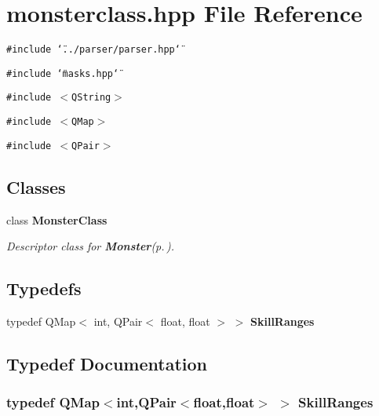 \section{monsterclass.hpp File Reference}
\label{monsterclass_8hpp}
{\tt \#include \char`\"{}../parser/parser.hpp\char`\"{}}\par
{\tt \#include \char`\"{}masks.hpp\char`\"{}}\par
{\tt \#include $<$QString$>$}\par
{\tt \#include $<$QMap$>$}\par
{\tt \#include $<$QPair$>$}\par
\subsection*{Classes}
\begin{CompactItemize}
\item 
class {\bf Monster\-Class}
\begin{CompactList}\small\item\em Descriptor class for {\bf Monster}{\rm (p.\,\pageref{classMonster})}. \item\end{CompactList}\end{CompactItemize}
\subsection*{Typedefs}
\begin{CompactItemize}
\item 
typedef QMap$<$ int, QPair$<$ float, float $>$ $>$ {\bf Skill\-Ranges}
\end{CompactItemize}


\subsection{Typedef Documentation}
\subsubsection{\setlength{\rightskip}{0pt plus 5cm}typedef QMap$<$int,QPair$<$float,float$>$ $>$ {\bf Skill\-Ranges}}\label{monsterclass_8hpp_a0}


